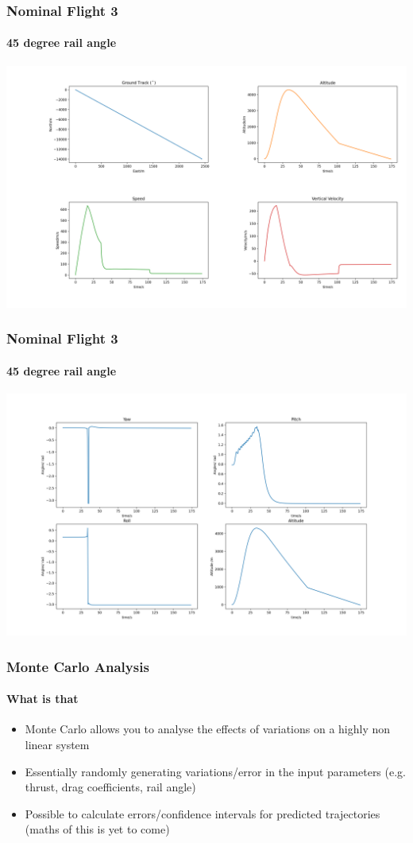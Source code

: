 \documentclass{beamer}
\begin{document}
    \begin{frame}
        \frametitle{Nominal Flight 3}
        \framesubtitle{45 degree rail angle}
        \begin{center}
            \includegraphics[width=\textwidth]{images/example3a.png}
        \end{center}
    \end{frame}
    \begin{frame}
        \frametitle{Nominal Flight 3}
        \framesubtitle{45 degree rail angle}
        \begin{center}
            \includegraphics[width=\textwidth]{images/example3b.png}
        \end{center}
    \end{frame}
    \begin{frame}
        \frametitle{Monte Carlo Analysis}
        \framesubtitle{What is that}
        \begin{itemize}
            \item Monte Carlo allows you to analyse the effects of variations on a highly non linear system
            \item Essentially randomly generating variations/error in the input parameters (e.g. thrust, drag coefficients, rail angle)
            \item Possible to calculate errors/confidence intervals for predicted trajectories (maths of this is yet to come)
        \end{itemize} 
    \end{frame}
\end{document}
